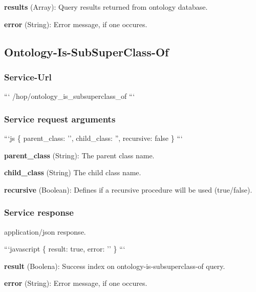 \begin{DoxyItemize}
\item {\bfseries results} (Array)\-: Query results returned from ontology database.
\item {\bfseries error} (String)\-: Error message, if one occures.
\end{DoxyItemize}

\subsection*{Ontology-\/\-Is-\/\-Sub\-Super\-Class-\/\-Of}

\subsubsection*{Service-\/\-Url}

``` /hop/ontology\-\_\-is\-\_\-subsuperclass\-\_\-of ```

\subsubsection*{Service request arguments}

```js \{ parent\-\_\-class\-: '', child\-\_\-class\-: '', recursive\-: false \} ```


\begin{DoxyItemize}
\item {\bfseries parent\-\_\-class} (String)\-: The parent class name.
\item {\bfseries child\-\_\-class} (String) The child class name.
\item {\bfseries recursive} (Boolean)\-: Defines if a recursive procedure will be used (true/false).
\end{DoxyItemize}

\subsubsection*{Service response}

application/json response.

```javascript \{ result\-: true, error\-: '' \} ```


\begin{DoxyItemize}
\item {\bfseries result} (Boolena)\-: Success index on ontology-\/is-\/subsuperclass-\/of query.
\item {\bfseries error} (String)\-: Error message, if one occures. 
\end{DoxyItemize}